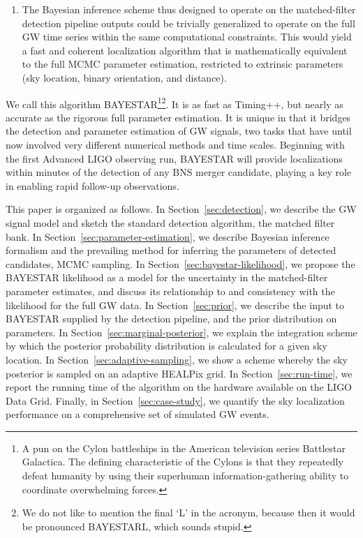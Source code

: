 \documentclass[amsmath,amssymb,aps,prx,reprint,nopreprintnumbers,nofootinbib]{revtex4-1}
\begin{document}
\begin{enumerate}
    \item The Bayesian inference scheme thus designed to operate on the matched\nobreakdashes-filter detection pipeline outputs could be trivially generalized to operate on the full \ac{GW} time series within the same computational constraints. This would yield a fast and coherent localization algorithm that is mathematically equivalent to the full \ac{MCMC} parameter estimation, restricted to extrinsic parameters (sky location, binary orientation, and distance).
\end{enumerate}
%
We call this algorithm \ac{BAYESTAR}\footnote{A pun on the Cylon battleships in the American television series Battlestar Galactica. The defining characteristic of the Cylons is that they repeatedly defeat humanity by using their superhuman information\nobreakdashes-gathering ability to coordinate overwhelming forces.}\footnote{We do not like to mention the final `L' in the acronym, because then it would be pronounced BAYESTARL, which sounds stupid.}. It is as fast as Timing++, but nearly as accurate as the rigorous full parameter estimation. It is unique in that it bridges the detection and parameter estimation of \ac{GW} signals, two tasks that have until now involved very different numerical methods and time scales. Beginning with the first Advanced \acs{LIGO} observing run, \ac{BAYESTAR} will provide localizations within minutes of the detection of any \ac{BNS} merger candidate, playing a key role in enabling rapid follow-up observations.

This paper is organized as follows. In Section~\ref{sec:detection}, we describe the \ac{GW} signal model and sketch the standard detection algorithm, the matched filter bank. In Section~\ref{sec:parameter-estimation}, we describe Bayesian inference formalism and the prevailing method for inferring the parameters of detected candidates, \ac{MCMC} sampling. In Section~\ref{sec:bayestar-likelihood}, we propose the \ac{BAYESTAR} likelihood as a model for the uncertainty in the matched\nobreakdashes-filter parameter estimates, and discuss its relationship to and consistency with the likelihood for the full \ac{GW} data. In Section~\ref{sec:prior}, we describe the input to \ac{BAYESTAR} supplied by the detection pipeline, and the prior distribution on parameters. In Section~\ref{sec:marginal-posterior}, we explain the integration scheme by which the posterior probability distribution is calculated for a given sky location. In Section~\ref{sec:adaptive-sampling}, we show a scheme whereby the sky posterior is sampled on an adaptive \acs{HEALPix} grid. In Section~\ref{sec:run-time}, we report the running time of the algorithm on the hardware available on the \ac{LIGO} Data Grid. Finally, in Section~\ref{sec:case-study}, we quantify the sky localization performance on a comprehensive set of simulated \ac{GW} events.
\end{document}

